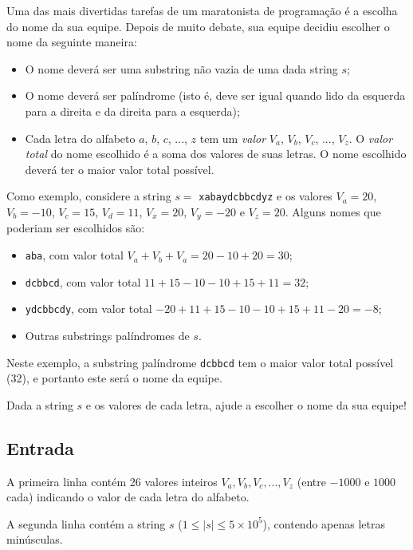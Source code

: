 Uma das mais divertidas tarefas de um maratonista de programação é a escolha do
nome da sua equipe. Depois de muito debate, sua equipe decidiu escolher o nome
da seguinte maneira:

\begin{itemize}
    \item O nome deverá ser uma substring não vazia de uma dada string $s$;
    \item O nome deverá ser palíndrome (isto é, deve ser igual quando lido da
            esquerda para a direita e da direita para a esquerda);
    \item Cada letra do alfabeto $a$, $b$, $c$, ..., $z$ tem um \textit{valor}
    $V_a$, $V_b$, $V_c$, ..., $V_z$. O \textit{valor total} do nome escolhido é a soma dos valores de
    suas letras. O nome escolhido deverá ter o maior valor total possível.
\end{itemize}

Como exemplo, considere a string $s = $ \verb|xabaydcbbcdyz| e os valores
$V_a = 20$, $V_b = -10$, $V_c = 15$, $V_d = 11$, $V_x = 20$, $V_y = -20$ e $V_z
= 20$. Alguns nomes que poderiam ser escolhidos são:

\begin{itemize}
    \item \verb|aba|, com valor total $V_a + V_b + V_a = 20-10+20 = 30$;
    \item \verb|dcbbcd|, com valor total $11 + 15 - 10 - 10 + 15 + 11 = 32$;
    \item \verb|ydcbbcdy|, com valor total $-20 + 11 + 15 - 10 - 10 + 15 + 11
    -20 = -8$;
    \item Outras substrings palíndromes de $s$.
\end{itemize}

Neste exemplo, a substring palíndrome \verb|dcbbcd| tem o maior valor total
possível (32), e portanto este será o nome da equipe.

Dada a string $s$ e os valores de cada letra, ajude a escolher o nome da sua
equipe!

\subsection*{Entrada}

A primeira linha contém 26 valores inteiros $V_a, V_b, V_c, ..., V_z$ (entre
        $-1000$ e $1000$ cada) indicando o
valor de cada letra do alfabeto.

A segunda linha contém a string $s$ ($1 \leq |s| \leq 5 \times 10^5$), contendo
apenas letras minúsculas.

